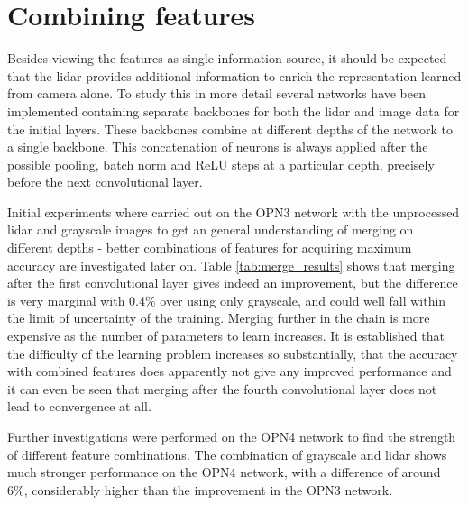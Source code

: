 \section{Combining features}
Besides viewing the features as single information source, it should be expected that the lidar provides additional information to enrich the representation learned from camera alone. To study this in more detail several networks have been implemented containing separate backbones for both the lidar and image data for the initial layers. These backbones combine at different depths of the network to a single backbone. This concatenation of neurons is always applied after the possible pooling, batch norm and ReLU steps at a particular depth, precisely before the next convolutional layer.

Initial experiments where carried out on the OPN3 network with the unprocessed lidar and grayscale images to get an general understanding of merging on different depths - better combinations of features for acquiring maximum accuracy are investigated later on. Table \ref{tab:merge_results} shows that merging after the first convolutional layer gives indeed an improvement, but the difference is very marginal with 0.4\% over using only grayscale, and could well fall within the limit of uncertainty of the training. Merging further in the chain is more expensive as the number of parameters to learn increases. It is established that the difficulty of the learning problem increases so substantially, that the accuracy with combined features does apparently not give any improved performance and it can even be seen that merging after the fourth convolutional layer does not lead to convergence at all. 

Further investigations were performed on the OPN4 network to find the strength of different feature combinations. The combination of grayscale and lidar shows much stronger performance on the OPN4 network, with a difference of around 6\%, considerably higher than the improvement in the OPN3 network.

